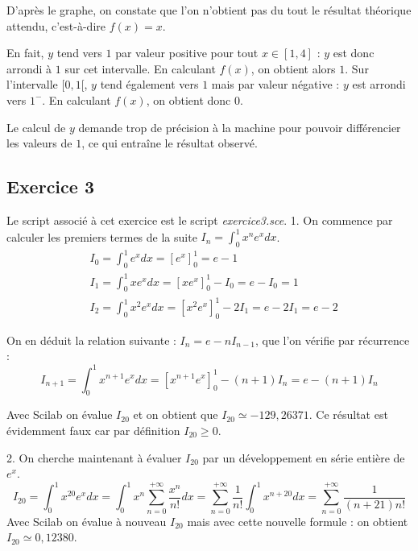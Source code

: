 \documentclass[a4paper,11pt]{article}
\begin{document}
	D'après le graphe, on constate que l'on n'obtient pas du tout le résultat théorique attendu, c'est-à-dire $f(x) = x$.
	
	En fait, $y$ tend vers $1$ par valeur positive pour tout $x \in [1, 4]$ : $y$ est donc arrondi à $1$ sur cet intervalle. En calculant $f(x)$, on obtient alors $1$. Sur l'intervalle $[0, 1[$, $y$ tend également vers $1$ mais par valeur négative : $y$ est arrondi vers $1^{-}$. En calculant $f(x)$, on obtient donc $0$.
	
	Le calcul de $y$ demande trop de précision à la machine pour pouvoir différencier les valeurs de $1$, ce qui entraîne le résultat observé.


\subsection*{Exercice 3}
	Le script associé à cet exercice est le script \textit{exercice3.sce}.
	1. On commence par calculer les premiers termes de la suite $I_{n} = \int_0^1 x^{n} e^{x} dx$.
	\begin{align*}
		& I_{0} = \int_0^1 e^{x} dx = [e^{x}]_0^1 = e - 1 \\
		& I_{1} = \int_0^1 x e^{x} dx = [x e^{x}]_0^1 - I_{0} = e - I_{0} = 1 \\
		& I_{2} = \int_0^1 x^{2} e^{x} dx = [x^{2} e^{x}]_0^1 - 2I_{1} = e - 2I_{1} = e - 2
	\end{align*}

	On en déduit la relation suivante : $I_{n} = e - nI_{n-1}$, que l'on vérifie par récurrence :
	\begin{equation*}
		I_{n+1} = \int_0^1 x^{n+1} e^{x} dx = [x^{n+1} e^{x}]_0^1 - (n+1) I_{n} = e - (n+1)I_{n}
	\end{equation*}

	Avec Scilab on évalue $I_{20}$ et on obtient que  $I_{20} \simeq -129,26371$. Ce résultat est évidemment faux car par définition  $I_{20} \geqslant 0$.

	2. On cherche maintenant à évaluer $I_{20}$ par un développement en série entière de $e^{x}$.
	\begin{equation*}
		I_{20} = \int_0^1 x^{20} e^{x} dx
		= \int_0^1 x^{n} \sum_{n=0}^{+\infty} \frac{x^{n}}{n!} dx
		= \sum_{n=0}^{+\infty} \frac{1}{n!} \int_0^1 x^{n+20} dx
		= \sum_{n=0}^{+\infty} \frac{1}{(n+21)n!}
	\end{equation*}
	Avec Scilab on évalue à nouveau $I_{20}$ mais avec cette nouvelle formule : on obtient $I_{20} \simeq 0,12380$.
	
\end{document}
